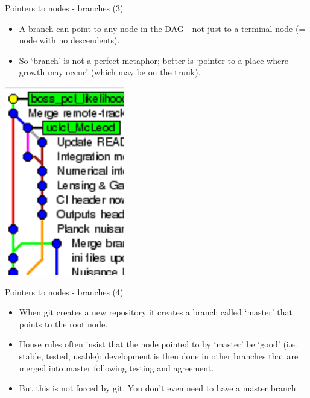 \documentclass[usenames,dvipsnames]{beamer}
\begin{document}
\begin{frame}{Pointers to nodes - branches (3)}
  \begin{block}{}
    \begin{itemize}
      \item{A branch can point to any node in the DAG - not just to a terminal node (= node with no descendents).}
      \item{So `branch' is not a perfect metaphor; better is `pointer to a place where growth may occur' (which may be on the trunk).}
    \end{itemize}
  \end{block}
  \begin{block}{}
    \begin{center}
      \includegraphics[scale=0.4]{Branch_3.png}
    \end{center}
  \end{block}
\end{frame}

\begin{frame}{Pointers to nodes - branches (4)}
  \begin{block}{}
    \begin{itemize}
      \item{When git creates a new repository it creates a branch called `master' that points to the root node.}
      \item{House rules often insist that the node pointed to by `master' be `good' (i.e. stable, tested, usable); development is then done in other branches that are merged into master following testing and agreement.}
      \item{But this is not forced by git. You don't even need to have a master branch.}
    \end{itemize}
  \end{block}
\end{frame}
\end{document}
